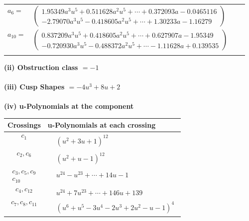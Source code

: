 \documentclass[1p]{elsarticle_modified}
\theoremstyle{definition}
\begin{document}
\begin{tabular}{m{7pt} m{180pt} m{7pt} m{180pt} }
\flushright $a_{6}=$&$\begin{pmatrix}1.95349 a^{3} u^{5}+0.511628 a^{2} u^{5}+\cdots+0.372093 a-0.0465116\\-2.79070 a^{3} u^{5}-0.418605 a^{2} u^{5}+\cdots+1.30233 a-1.16279\end{pmatrix}$ \\
\flushright $a_{10}=$&$\begin{pmatrix}0.837209 a^{3} u^{5}+0.418605 a^{2} u^{5}+\cdots+0.627907 a-1.95349\\-0.720930 a^{3} u^{5}-0.488372 a^{2} u^{5}+\cdots-1.11628 a+0.139535\end{pmatrix}$\\&\end{tabular}
\flushleft \textbf{(ii) Obstruction class $= -1$}\\~\\
\flushleft \textbf{(iii) Cusp Shapes $= -4 u^3+8 u+2$}\\~\\
\newpage\renewcommand{\arraystretch}{1}
\flushleft \textbf{(iv) u-Polynomials at the component}\newline \\
\begin{tabular}{m{50pt}|m{274pt}}
Crossings & \hspace{64pt}u-Polynomials at each crossing \\
\hline $$\begin{aligned}c_{1}\end{aligned}$$&$\begin{aligned}
&(u^2+3 u+1)^{12}
\end{aligned}$\\
\hline $$\begin{aligned}c_{2},c_{6}\end{aligned}$$&$\begin{aligned}
&(u^2+u-1)^{12}
\end{aligned}$\\
\hline $$\begin{aligned}c_{3},c_{5},c_{9}\\c_{10}\end{aligned}$$&$\begin{aligned}
&u^{24}- u^{23}+\cdots+14 u-1
\end{aligned}$\\
\hline $$\begin{aligned}c_{4},c_{12}\end{aligned}$$&$\begin{aligned}
&u^{24}+7 u^{23}+\cdots+146 u+139
\end{aligned}$\\
\hline $$\begin{aligned}c_{7},c_{8},c_{11}\end{aligned}$$&$\begin{aligned}
&(u^6+u^5-3 u^4-2 u^3+2 u^2- u-1)^4
\end{aligned}$\\
\hline
\end{tabular}\\~\\
\end{document}
